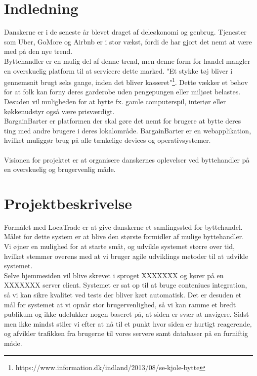 \chapter{Indledning}\label{ch:Indledning}
Danskerne er i de seneste år blevet draget af deleøkonomi og genbrug. Tjenester som Uber, GoMore og Airbnb er i stor vækst, fordi de har gjort det nemt at være med på den nye trend. \\Byttehandler er en mulig del af denne trend, men denne form for handel mangler en overskuelig platform til at servicere dette marked. "Et stykke tøj bliver i gennemsnit brugt seks gange, inden det bliver kasseret"\footnote{https://www.information.dk/indland/2013/08/se-kjole-bytte}. Dette vækker et behov for at folk kan forny deres garderobe uden pengepungen eller miljøet belastes. Desuden vil muligheden for at bytte fx. gamle computerspil, interiør eller køkkenudstyr også være prisværdigt. \\
BargainBarter er platformen der skal gøre det nemt for brugere at bytte deres ting med andre brugere i deres lokalområde. BargainBarter er en webapplikation, hvilket muliggør brug på alle tænkelige devices og operativsystemer. \\ \\
Visionen for projektet er at organisere danskernes oplevelser ved byttehandler på en overskuelig og brugervenlig måde. 


\chapter{Projektbeskrivelse}\label{ch:Projektbeskrivelse}
Formålet med LocaTrade er at give danskerne et samlingssted for byttehandel. \\
Målet for dette system er at blive den største formidler af mulige byttehandler. Vi øjner en mulighed for at starte småt, og udvikle systemet større over tid, hvilket stemmer overens med at vi bruger agile udviklings metoder til at udvikle systemet. \\ Selve hjemmesiden vil blive skrevet i sproget XXXXXXX og kører på en XXXXXXX server client. Systemet er sat op til at bruge conteniues integration, så vi kan sikre kvalitet ved tests der bliver kørt automatisk. Det er desuden et mål for systemet at vi opnår stor brugervenlighed, så vi kan ramme et bredt publikum og ikke udelukker nogen baseret på, at siden er svær at navigere. Sidst men ikke mindst stiler vi efter at nå til et punkt hvor siden er hurtigt reagerende, og afvikler trafikken fra brugerne til vores servere samt databaser på en furniftig måde. 


